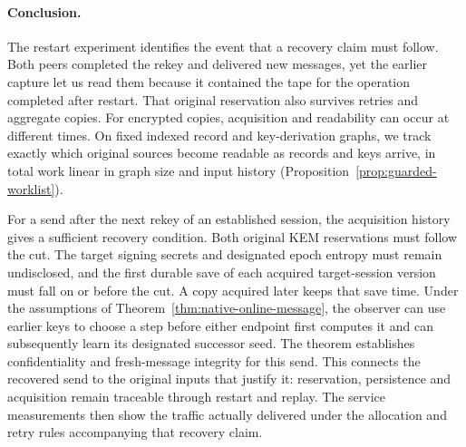 \paragraph{Conclusion.}
The restart experiment identifies the event that a recovery claim must
follow. Both peers completed the rekey and delivered new messages, yet
the earlier capture let us read them because it contained the tape for
the operation completed after restart. That original reservation also
survives retries and aggregate copies. For encrypted copies, acquisition
and readability can occur at different times. On fixed indexed record
and key-derivation graphs, we track exactly which original sources become
readable as records and keys arrive, in total work linear in graph size
and input history (Proposition~\ref{prop:guarded-worklist}).

For a send after the next rekey of an established session, the
acquisition history gives a sufficient recovery condition. Both original KEM
reservations must follow the cut. The target signing secrets and
designated epoch entropy must remain undisclosed, and the first durable
save of each acquired target-session version must fall on or before the
cut. A copy acquired later keeps that save time. Under the assumptions
of Theorem~\ref{thm:native-online-message}, the observer can use earlier
keys to choose a step before either endpoint first computes it and can
subsequently learn its designated successor seed. The theorem establishes
confidentiality and fresh-message integrity for this send.
This connects the recovered send to the original inputs that justify
it: reservation, persistence and acquisition remain traceable through
restart and replay. The service measurements then show the traffic
actually delivered under the allocation and retry rules accompanying
that recovery claim.
